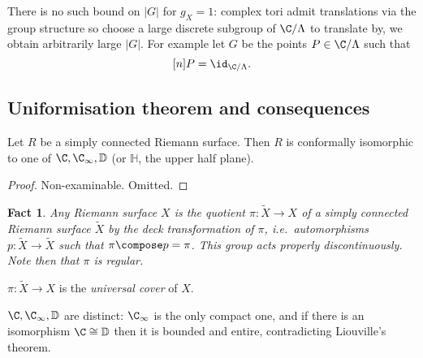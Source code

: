 \documentclass[a4paper]{article}
\newtheorem*{fact}{Fact}
\begin{document}
\begin{remark}
  There is no such bound on \(|G|\) for \(g_X = 1\): complex tori admit translations via the group structure so choose a large discrete subgroup of \(\C/\Lambda\) to translate by, we obtain arbitrarily large \(|G|\). For example let \(G\) be the points \(P \in \C/\Lambda\) such that
  \[
    [n] P = \id_{\C/\Lambda}.
  \]
\end{remark}

\subsection{Uniformisation theorem and consequences}

\begin{theorem}
  Let \(R\) be a simply connected Riemann surface. Then \(R\) is conformally isomorphic to one of \(\C, \C_\infty, \mathbb D\) (or \(\mathbb H\), the upper half plane).
\end{theorem}

\begin{proof}
  Non-examinable. Omitted.
\end{proof}

\begin{fact}
  Any Riemann surface \(X\) is the quotient \(\pi: \tilde X \to X\) of a simply connected Riemann surface \(\tilde X\) by the deck transformation of \(\pi\), i.e.\ automorphisms \(p: \tilde X \to \tilde X\) such that \(\pi \compose p = \pi\). This group acts properly discontinuously. Note then that \(\pi\) is regular.
\end{fact}

\begin{definition}
  \(\pi: \tilde X \to X\) is the \emph{universal cover} of \(X\).
\end{definition}

\begin{remark}
  \(\C, \C_\infty, \mathbb D\) are distinct: \(\C_\infty\) is the only compact one, and if there is an isomorphism \(\C \cong \mathbb D\) then it is bounded and entire, contradicting Liouville's theorem.
\end{remark}
\end{document}
